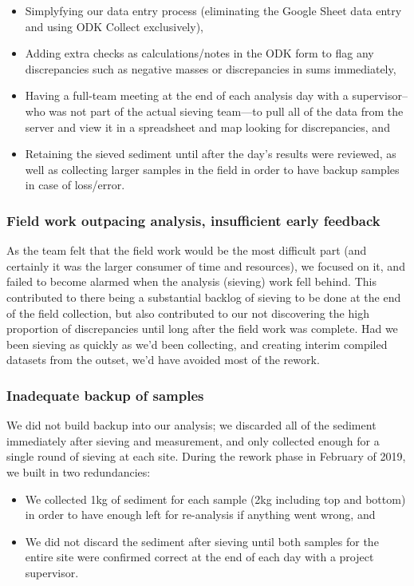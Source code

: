 \documentclass[a4paper,12pt]{article}
\begin{document}
\begin{itemize}
  \item Simplyfying our data entry process (eliminating the Google Sheet data entry and using ODK Collect exclusively),
  \item Adding extra checks as calculations/notes in the ODK form to flag any discrepancies such as negative masses or discrepancies in sums immediately,
  \item Having a full-team meeting at the end of each analysis day with a supervisor--who was not part of the actual sieving team---to pull all of the data from the server and view it in a spreadsheet and map looking for discrepancies, and
  \item Retaining the sieved sediment until after the day's results were reviewed, as well as collecting larger samples in the field in order to have backup samples in case of loss/error.
\end{itemize}

  
\subsubsection{Field work outpacing analysis, insufficient early feedback}
As the team felt that the field work would be the most difficult part (and certainly it was the larger consumer of time and resources), we focused on it, and failed to become alarmed when the analysis (sieving) work fell behind. This contributed to there being a substantial backlog of sieving to be done at the end of the field collection, but also contributed to our not discovering the high proportion of discrepancies until long after the field work was complete. Had we been sieving as quickly as we'd been collecting, and creating interim compiled datasets from the outset, we'd have avoided most of the rework.

\subsubsection{Inadequate backup of samples}
We did not build backup into our analysis; we discarded all of the sediment immediately after sieving and measurement, and only collected enough for a single round of sieving at each site. During the rework phase in February of 2019, we built in two redundancies:

\begin{itemize}
  \item We collected 1kg of sediment for each sample (2kg including top and bottom) in order to have enough left for re-analysis if anything went wrong, and
  \item We did not discard the sediment after sieving until both samples for the entire site were confirmed correct at the end of each day with a project supervisor.
\end{itemize}
\end{document}
